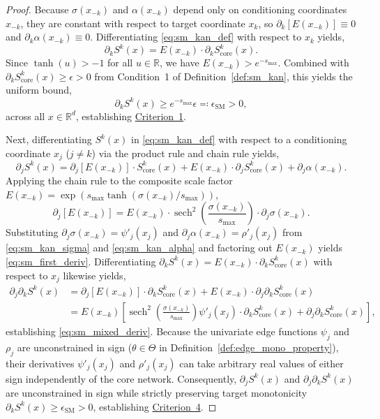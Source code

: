 \documentclass[11pt,a4paper]{article}
\theoremstyle{plain}
\theoremstyle{definition}
\theoremstyle{remark}
\begin{document}
\begin{proof}
Because $\sigma(x_{-k})$ and $\alpha(x_{-k})$ depend only on conditioning coordinates $x_{-k}$, they are constant with respect to target coordinate $x_k$, so $\partial_k [E(x_{-k})] \equiv 0$ and $\partial_k \alpha(x_{-k}) \equiv 0$. Differentiating \eqref{eq:sm_kan_def} with respect to $x_k$ yields,
\begin{equation}
    \partial_k S^k(x) = E(x_{-k}) \cdot \partial_k S^k_{\text{core}}(x).
\end{equation}
Since $\tanh(u) > -1$ for all $u \in \mathbb{R}$, we have $E(x_{-k}) > e^{-s_{\max}}$. Combined with $\partial_k S^k_{\text{core}}(x) \ge \epsilon > 0$ from Condition~1 of Definition~\ref{def:sm_kan}, this yields the uniform bound,
\begin{equation}
    \partial_k S^k(x) \ge e^{-s_{\max}} \epsilon \eqqcolon \epsilon_{\text{SM}} > 0,
\end{equation}
across all $x \in \mathbb{R}^d$, establishing \hyperref[crit:target_monotonicity]{Criterion~1}.

Next, differentiating $S^k(x)$ in \eqref{eq:sm_kan_def} with respect to a conditioning coordinate $x_j$ ($j \neq k$) via the product rule and chain rule yields,
\begin{equation}
    \partial_j S^k(x) = \partial_j [E(x_{-k})] \cdot S^k_{\text{core}}(x) + E(x_{-k}) \cdot \partial_j S^k_{\text{core}}(x) + \partial_j \alpha(x_{-k}).
\end{equation}
Applying the chain rule to the composite scale factor $E(x_{-k}) = \exp(s_{\max}\tanh(\sigma(x_{-k})/s_{\max}))$,
\begin{equation}
    \partial_j [E(x_{-k})] = E(x_{-k}) \cdot \operatorname{sech}^2\left(\frac{\sigma(x_{-k})}{s_{\max}}\right) \cdot \partial_j \sigma(x_{-k}).
\end{equation}
Substituting $\partial_j \sigma(x_{-k}) = \psi'_j(x_j)$ and $\partial_j \alpha(x_{-k}) = \rho'_j(x_j)$ from \eqref{eq:sm_kan_sigma} and \eqref{eq:sm_kan_alpha} and factoring out $E(x_{-k})$ yields \eqref{eq:sm_first_deriv}. Differentiating $\partial_k S^k(x) = E(x_{-k}) \cdot \partial_k S^k_{\text{core}}(x)$ with respect to $x_j$ likewise yields,
\begin{align}
    \partial_j \partial_k S^k(x) &= \partial_j [E(x_{-k})] \cdot \partial_k S^k_{\text{core}}(x) + E(x_{-k}) \cdot \partial_j \partial_k S^k_{\text{core}}(x) \nonumber \\
    &= E(x_{-k}) \left[ \operatorname{sech}^2\left(\frac{\sigma(x_{-k})}{s_{\max}}\right) \psi'_j(x_j) \cdot \partial_k S^k_{\text{core}}(x) + \partial_j \partial_k S^k_{\text{core}}(x) \right],
\end{align}
establishing \eqref{eq:sm_mixed_deriv}. Because the univariate edge functions $\psi_j$ and $\rho_j$ are unconstrained in sign ($\theta \in \Theta$ in Definition~\ref{def:edge_mono_property}), their derivatives $\psi'_j(x_j)$ and $\rho'_j(x_j)$ can take arbitrary real values of either sign independently of the core network. Consequently, $\partial_j S^k(x)$ and $\partial_j \partial_k S^k(x)$ are unconstrained in sign while strictly preserving target monotonicity $\partial_k S^k(x) \ge \epsilon_{\text{SM}} > 0$, establishing \hyperref[crit:conditioning_freedom]{Criterion~4}.
\end{proof}
\end{document}
